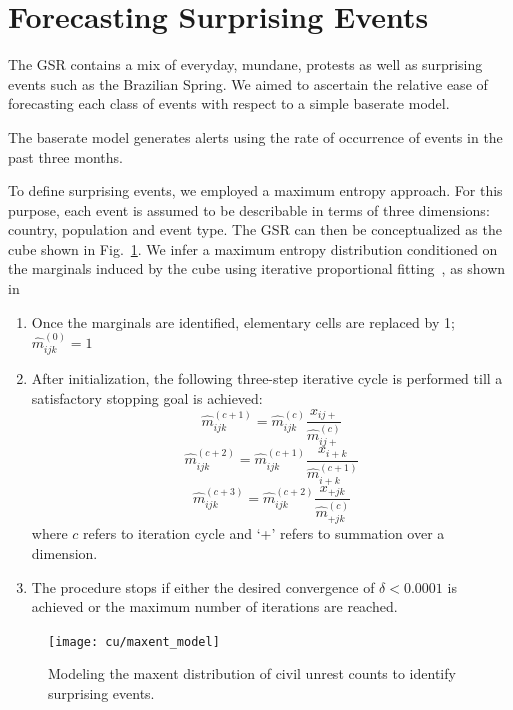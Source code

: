 \section{Forecasting Surprising Events}
The GSR contains a mix of everyday, mundane, protests as well as surprising events such as the Brazilian Spring.
We aimed to ascertain the relative ease of forecasting each class of events
with respect to a simple baserate model.

The baserate model generates alerts using the rate of occurrence of events in the past three months.

To define surprising events,
we employed a maximum entropy approach. For this purpose, each event is assumed
to be describable
in terms of three dimensions: country, population and event type. The GSR can then be conceptualized
as the cube shown in Fig.~\ref{fig:maxent_model}. We infer a maximum entropy distribution conditioned on the marginals
induced by the cube using iterative proportional fitting~\cite{bishop2007discrete}, as shown in 

\begin{enumerate}
\item Once the marginals are identified, elementary cells are replaced by 1; $\widehat{m}^{(0)}_{ijk}=1$
\item After initialization, the following three-step iterative cycle is performed till a satisfactory stopping goal is achieved:
$$\widehat{m}^{(c+1)}_{ijk} = \widehat{m}^{(c)}_{ijk}\frac{x_{ij+}}{\widehat{m}^{(c)}_{ij+}}$$
$$\widehat{m}^{(c+2)}_{ijk} = \widehat{m}^{(c+1)}_{ijk}\frac{x_{i+k}}{\widehat{m}^{(c+1)}_{i+k}}$$
$$\widehat{m}^{(c+3)}_{ijk} = \widehat{m}^{(c+2)}_{ijk}\frac{x_{+jk}}{\widehat{m}^{(c)}_{+jk}}$$
where $c$ refers to iteration cycle and `+' refers to summation over a dimension.
\item The procedure stops if either the desired convergence of $\delta < 0.0001$ is achieved or the maximum number of iterations are reached.
\end{enumerate}


\begin{figure}[H]
\centering
\texttt{[image: cu/maxent\_model]}
\caption{Modeling the maxent distribution of civil unrest counts to identify surprising events.}
\label{fig:maxent_model}
\end{figure}

